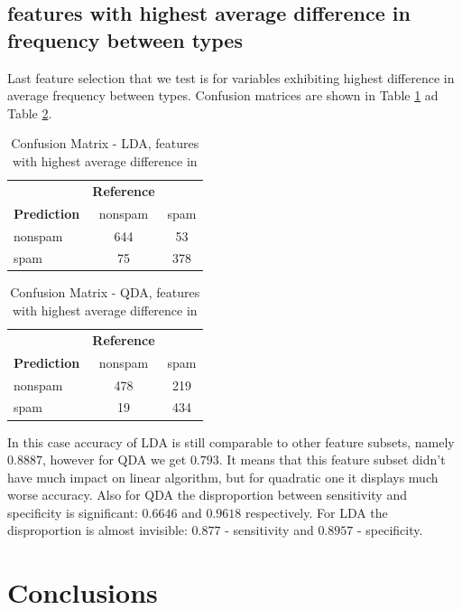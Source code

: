 \documentclass{article}\usepackage[]{graphicx}\usepackage[]{xcolor}
\begin{document}
	 \subsection*{features with highest average difference in frequency between types}
	 
Last feature selection that we test is for variables exhibiting highest difference in 
average frequency between types. Confusion matrices are shown in Table 
\ref{tab:confusion_matrix_lda5} ad Table \ref{tab:confusion_matrix_qda5}.
	 
	 \begin{table}[h]
	 	\centering
	 	\begin{tabular}{lcc}
	 		& \textbf{Reference} & \\
	 		\textbf{Prediction} & nonspam & spam \\
	 		nonspam & 644 & 53 \\
	 		spam & 75 & 378 \\
	 	\end{tabular}
	 	\caption{Confusion Matrix - LDA, features with highest average difference in}
	 	\label{tab:confusion_matrix_lda5}
	 \end{table}
	 
	 \begin{table}[h]
	 	\centering
	 	\begin{tabular}{lcc}
	 		& \textbf{Reference} & \\
	 		\textbf{Prediction} & nonspam & spam \\
	 		nonspam & 478 & 219 \\
	 		spam & 19 & 434 \\
	 	\end{tabular}
	 	\caption{Confusion Matrix - QDA, features with highest average difference in}
	 	\label{tab:confusion_matrix_qda5}
	 \end{table}
	 
In this case accuracy of LDA is still comparable to other feature subsets, namely 
$0.8887$, however for QDA we get $0.793$. It means that this feature subset didn't 
have much impact on linear algorithm, but for quadratic one it displays much worse accuracy. 
Also for QDA the disproportion between sensitivity and specificity is significant: 
$0.6646$ and $0.9618$ respectively. For LDA the disproportion is almost invisible: 
$0.877$ - sensitivity and $0.8957$ - specificity.

\section{Conclusions}
\end{document}
